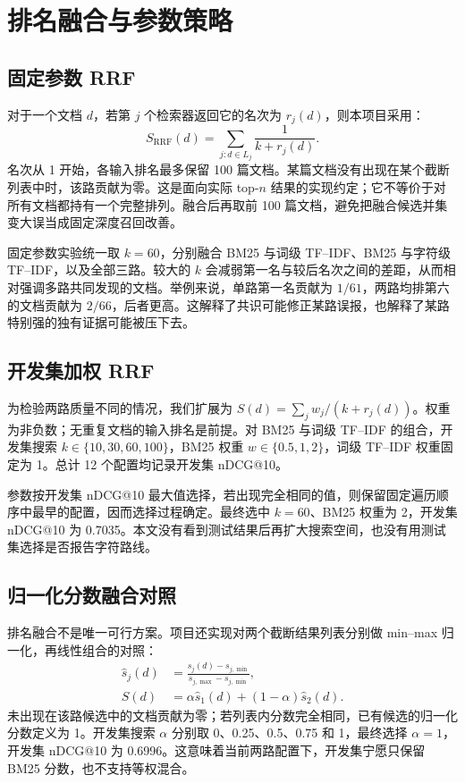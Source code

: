 \documentclass[sigconf,nonacm]{acmart}
\begin{document}
\section{排名融合与参数策略}
\subsection{固定参数 RRF}
对于一个文档 $d$，若第 $j$ 个检索器返回它的名次为 $r_j(d)$，则本项目采用：
\begin{equation}
S_{\mathrm{RRF}}(d)=\sum_{j:d\in L_j}\frac{1}{k+r_j(d)}.
\end{equation}
名次从 1 开始，各输入排名最多保留 100 篇文档。某篇文档没有出现在某个截断列表中时，该路贡献为零。这是面向实际 top-$n$ 结果的实现约定；它不等价于对所有文档都持有一个完整排列。融合后再取前 100 篇文档，避免把融合候选并集变大误当成固定深度召回改善。

固定参数实验统一取 $k=60$，分别融合 BM25 与词级 TF--IDF、BM25 与字符级 TF--IDF，以及全部三路。较大的 $k$ 会减弱第一名与较后名次之间的差距，从而相对强调多路共同发现的文档。举例来说，单路第一名贡献为 $1/61$，两路均排第六的文档贡献为 $2/66$，后者更高。这解释了共识可能修正某路误报，也解释了某路特别强的独有证据可能被压下去。

\subsection{开发集加权 RRF}
为检验两路质量不同的情况，我们扩展为 $S(d)=\sum_j w_j/(k+r_j(d))$。权重为非负数；无重复文档的输入排名是前提。对 BM25 与词级 TF--IDF 的组合，开发集搜索 $k\in\{10,30,60,100\}$，BM25 权重 $w\in\{0.5,1,2\}$，词级 TF--IDF 权重固定为 1。总计 12 个配置均记录开发集 nDCG@10。

参数按开发集 nDCG@10 最大值选择，若出现完全相同的值，则保留固定遍历顺序中最早的配置，因而选择过程确定。最终选中 $k=60$、BM25 权重为 2，开发集 nDCG@10 为 0.7035。本文没有看到测试结果后再扩大搜索空间，也没有用测试集选择是否报告字符路线。

\subsection{归一化分数融合对照}
排名融合不是唯一可行方案。项目还实现对两个截断结果列表分别做 min--max 归一化，再线性组合的对照：
\begin{equation}
\begin{aligned}
\widehat s_j(d)&=\frac{s_j(d)-s_{j,\min}}{s_{j,\max}-s_{j,\min}},\\
S(d)&=\alpha\widehat s_1(d)+(1-\alpha)\widehat s_2(d).
\end{aligned}
\end{equation}
未出现在该路候选中的文档贡献为零；若列表内分数完全相同，已有候选的归一化分数定义为 1。开发集搜索 $\alpha$ 分别取 0、0.25、0.5、0.75 和 1，最终选择 $\alpha=1$，开发集 nDCG@10 为 0.6996。这意味着当前两路配置下，开发集宁愿只保留 BM25 分数，也不支持等权混合。
\end{document}
